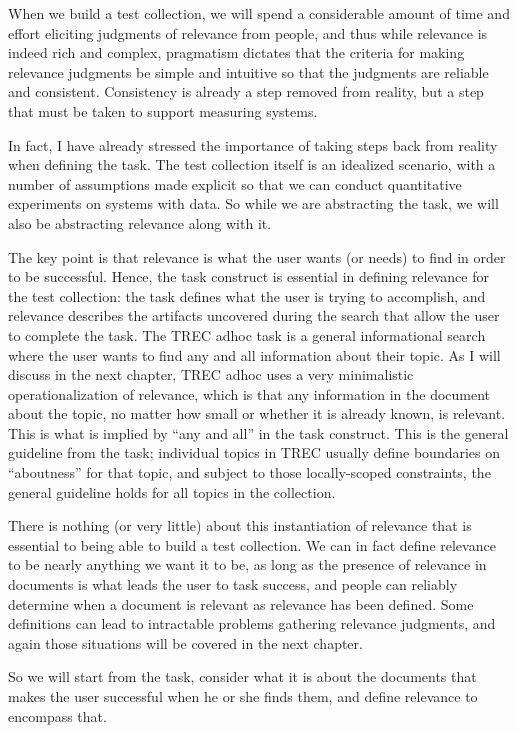 \documentclass[nobib]{tufte-book}
\begin{document}
When we build a test collection, we will spend a considerable amount of time and effort eliciting judgments of relevance from people, and thus while relevance is indeed rich and complex, pragmatism dictates that the criteria for making relevance judgments be simple and intuitive so that the judgments are reliable and consistent.  Consistency is already a step removed from reality, but a step that must be taken to support measuring systems.

In fact, I have already stressed the importance of taking steps back from reality when defining the task.  The test collection itself is an idealized scenario, with a number of assumptions made explicit so that we can conduct quantitative experiments on systems with data.  So while we are abstracting the task, we will also be abstracting relevance along with it.

The key point is that relevance is what the user wants (or needs) to find in order to be successful.  Hence, the task construct is essential in defining relevance for the test collection: the task defines what the user is trying to accomplish, and relevance describes the artifacts uncovered during the search that allow the user to complete the task.  The TREC adhoc task is a general informational search where the user wants to find any and all information about their topic.  As I will discuss in the next chapter, TREC adhoc uses a very minimalistic operationalization of relevance, which is that any information in the document about the topic, no matter how small or whether it is already known, is relevant.  This is what is implied by ``any and all'' in the task construct.  This is the general guideline from the task; individual topics in TREC usually define boundaries on ``aboutness'' for that topic, and subject to those locally-scoped constraints, the general guideline holds for all topics in the collection.

There is nothing (or very little) about this instantiation of relevance that is essential to being able to build a test collection.  We can in fact define relevance to be nearly anything we want it to be, as long as the presence of relevance in documents is what leads the user to task success, and people can reliably determine when a document is relevant as relevance has been defined.  Some definitions can lead to intractable problems gathering relevance judgments, and again those situations will be covered in the next chapter.

So we will start from the task, consider what it is about the documents that makes the user successful when he or she finds them, and define relevance to encompass that.
\end{document}
